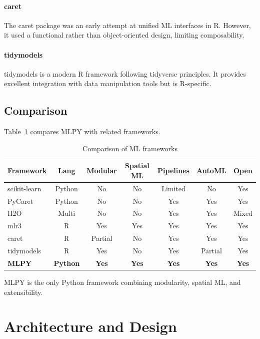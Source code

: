 \documentclass[twoside,11pt]{article}
\begin{document}
\paragraph{caret}
The caret package \citep{kuhn2008caret} was an early attempt at unified ML
interfaces in R. However, it used a functional rather than object-oriented
design, limiting composability.

\paragraph{tidymodels}
tidymodels \citep{tidymodels} is a modern R framework following tidyverse
principles. It provides excellent integration with data manipulation tools but
is R-specific.

\subsection{Comparison}

Table~\ref{tab:comparison} compares MLPY with related frameworks.

\begin{table}[h]
\centering
\caption{Comparison of ML frameworks}
\label{tab:comparison}
\begin{tabular}{lcccccc}
\toprule
Framework & Lang & Modular & Spatial ML & Pipelines & AutoML & Open \\
\midrule
scikit-learn & Python & No & No & Limited & No & Yes \\
PyCaret & Python & No & No & Yes & Yes & Yes \\
H2O & Multi & No & No & Yes & Yes & Mixed \\
mlr3 & R & Yes & Yes & Yes & Yes & Yes \\
caret & R & Partial & No & Yes & Yes & Yes \\
tidymodels & R & Yes & No & Yes & Partial & Yes \\
\midrule
\textbf{MLPY} & \textbf{Python} & \textbf{Yes} & \textbf{Yes} & \textbf{Yes} & \textbf{Yes} & \textbf{Yes} \\
\bottomrule
\end{tabular}
\end{table}

MLPY is the only Python framework combining modularity, spatial ML, and
extensibility.

\section{Architecture and Design}
\label{sec:architecture}
\end{document}

